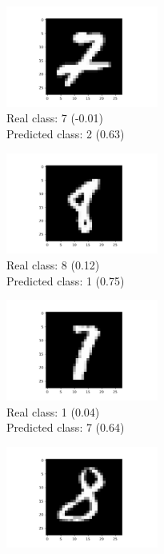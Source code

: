 \documentclass[a4paper]{article}    %
\begin{document}
\begin{figure}[H]
\begin{subfigure}{0.32\textwidth}
        \includegraphics[width=5.0cm]{21}
        \caption{
            Real class: 7 (-0.01)\\
            Predicted class: 2 (0.63)}
        \label{fig:example_8}
    \end{subfigure}
    \hfill
    \begin{subfigure}{0.32\textwidth}
        \centering
        \includegraphics[width=5.0cm]{24}
        \caption{
            Real class: 8 (0.12)\\
            Predicted class: 1 (0.75)}
        \label{fig:example_9}
    \end{subfigure}
    \hfill
    \begin{subfigure}{0.32\textwidth}
        \centering
        \includegraphics[width=5.0cm]{26}
        \caption{
            Real class: 1 (0.04)\\
            Predicted class: 7 (0.64)}
        \label{fig:example_10}
    \end{subfigure}
    \hfill
    \begin{subfigure}{0.32\textwidth}
        \centering
        \includegraphics[width=5.0cm]{15}

\end{subfigure}
\end{figure}
\end{document}
